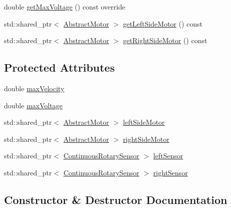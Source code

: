 \begin{DoxyCompactItemize}
\item 
double \mbox{\hyperlink{classokapi_1_1SkidSteerModel_ad4849d18c3a244eb60e1056860a3c4cf}{get\+Max\+Voltage}} () const override
\item 
std\+::shared\+\_\+ptr$<$ \mbox{\hyperlink{classokapi_1_1AbstractMotor}{Abstract\+Motor}} $>$ \mbox{\hyperlink{classokapi_1_1SkidSteerModel_a3f1813ada8205396c35abccbc0c9ff21}{get\+Left\+Side\+Motor}} () const
\item 
std\+::shared\+\_\+ptr$<$ \mbox{\hyperlink{classokapi_1_1AbstractMotor}{Abstract\+Motor}} $>$ \mbox{\hyperlink{classokapi_1_1SkidSteerModel_a0c58a580708b864d8c4391c7045e590b}{get\+Right\+Side\+Motor}} () const
\end{DoxyCompactItemize}
\subsection*{Protected Attributes}
\begin{DoxyCompactItemize}
\item 
double \mbox{\hyperlink{classokapi_1_1SkidSteerModel_a7328ea414229603ad144297832aba668}{max\+Velocity}}
\item 
double \mbox{\hyperlink{classokapi_1_1SkidSteerModel_a5a8c43598d98dad4d2c76d5c5c9b34ad}{max\+Voltage}}
\item 
std\+::shared\+\_\+ptr$<$ \mbox{\hyperlink{classokapi_1_1AbstractMotor}{Abstract\+Motor}} $>$ \mbox{\hyperlink{classokapi_1_1SkidSteerModel_a086c099795122b42cf66c67a334a6c30}{left\+Side\+Motor}}
\item 
std\+::shared\+\_\+ptr$<$ \mbox{\hyperlink{classokapi_1_1AbstractMotor}{Abstract\+Motor}} $>$ \mbox{\hyperlink{classokapi_1_1SkidSteerModel_a858a234f53f66803c7a498e69c86032b}{right\+Side\+Motor}}
\item 
std\+::shared\+\_\+ptr$<$ \mbox{\hyperlink{classokapi_1_1ContinuousRotarySensor}{Continuous\+Rotary\+Sensor}} $>$ \mbox{\hyperlink{classokapi_1_1SkidSteerModel_ae286eda43ccd14ac74c06c95f05b14eb}{left\+Sensor}}
\item 
std\+::shared\+\_\+ptr$<$ \mbox{\hyperlink{classokapi_1_1ContinuousRotarySensor}{Continuous\+Rotary\+Sensor}} $>$ \mbox{\hyperlink{classokapi_1_1SkidSteerModel_a35b26b12648944bb561e7978468fd679}{right\+Sensor}}
\end{DoxyCompactItemize}


\subsection{Constructor \& Destructor Documentation}
\mbox{\label{classokapi_1_1SkidSteerModel_ac79ebd9b643ea68da98576ec355e94a5}} 
